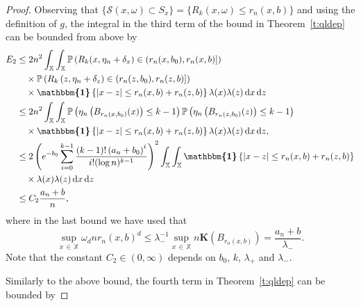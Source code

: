 \documentclass[AHL,Unicode,longabstracts]{cedram}
\newcommand*\bK{\mathbf{K}}
\renewcommand*\P{\mathbb{P}}
\newcommand*\X{\mathbb{X}}
\newcommand*\cS{\mathcal{S}}
\newcommand*\md{\mathrm{d}}
\newcommand{\ind}{\boldsymbol{\mathbbm{1}}}
\newcommand{\set}[1]{\left\{#1\right\}}
\newcommand{\param}[1]{\left(#1\right)}
\newcommand{\prob}[1]{\P\left(#1\right)}
\begin{document}
\begin{proof}
Observing that $\{\cS(x,\omega) \subset S_x \} = \{R_k(x,\omega) \leq r_n(x,b) \}$ and using the definition of $g$, the integral in the third term of the bound in Theorem~\ref{t:qldep} can be bounded from above by
\begin{equation}\label{e:knngt3}
\begin{split}
E_2
&\leq {2} n^2 \int_{\X}\int_{\X} \prob{R_k(x,\eta_n + \delta_x) \in \left(r_n(x,b_0),r_n(x,b)\right]}\\
&\quad\times\prob{R_k\left(z,\eta_n + \delta_z\right) \in \left(r_n(z,b_0),r_n(z,b)\right]}\\
& \quad\times \ind\set{|x-z| \leq r_n(x,b) + r_n(z,b)} \lambda(x)\lambda(z) \, \md x \, \md z\\
& \leq {2} n^2 \int_{\X}\int_{\X} \prob{\eta_n\left(B_{r_n(x,b_0)}(x)\right) \leq k-1}\prob{\eta_n\left(B_{r_n(z,b_0)}(z)\right) \leq k-1} \\
& \quad\times \ind\set{|x-z| \leq r_n(x,b) + r_n(z,b)} \lambda(x)\lambda(z) \, \md x \, \md z, \\
& \leq {2} \param{e^{-b_0} \sum_{i=0}^{k-1} \frac{(k-1)!\left(a_n+b_0\right)^i}{ i! (\log n)^{k-1}}}^2 \int_{\X}\int_{\X} \ind\set{|x-z| \leq r_n(x,b) + r_n(z,b)} \\
&\quad\times\lambda(x)\lambda(z) \, \md x \, \md z \\
& \leq C_2 \frac{a_n + b}{n},
\end{split}
\end{equation}
where in the last bound we have used that 
\[
\sup_{x\, \in\,\X}\omega_dnr_n(x,b)^d \leq \lambda_-^{-1} \sup_{x\,\in\,\X} n\bK\left(B_{r_n(x,b)}\right) =\frac{a_n + b}{\lambda_-}.
\]
Note that the constant $C_2\in(0,\infty)$ depends on $b_0$, $k$, $\lambda_+$ and $\lambda_-$.

Similarly to the above bound, the fourth term in Theorem~\ref{t:qldep} can be bounded by



\end{proof}
\end{document}
